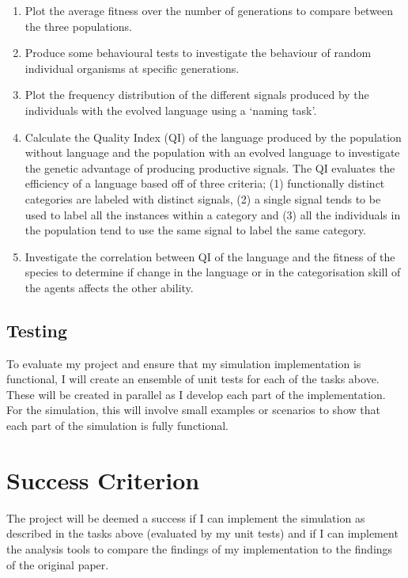 \documentclass[12pt,a4paper,twoside]{article}
\begin{document}
\begin{enumerate}

\item Plot the average fitness over the number of generations to compare between the three populations.

\item Produce some behavioural tests to investigate the behaviour of random individual organisms at specific generations.

\item Plot the frequency distribution of the different signals produced by the individuals with the evolved language using a `naming task'.

\item Calculate the Quality Index (QI) of the language produced by the population without language and the population with an evolved language to investigate the genetic advantage of producing productive signals. The QI evaluates the efficiency of a language based off of three criteria; (1) functionally distinct categories are labeled with distinct signals, (2) a single signal tends to be used to label all the instances within a category and (3) all the individuals in the population tend to use the same signal to label the same category.

\item Investigate the correlation between QI of the language and the fitness of the species to determine if change in the language or in the categorisation skill of the agents affects the other ability.

\end{enumerate}

\subsection*{Testing}

To evaluate my project and ensure that my simulation implementation is functional, I will create an ensemble of unit tests for each of the tasks above. These will be created in parallel as I develop each part of the implementation. For the simulation, this will involve small examples or scenarios to show that each part of the simulation is fully functional.

\section*{Success Criterion}

The project will be deemed a success if I can implement the simulation as described in the tasks above (evaluated by my unit tests) and if I can implement the analysis tools to compare the findings of my implementation to the findings of the original paper.
\end{document}
